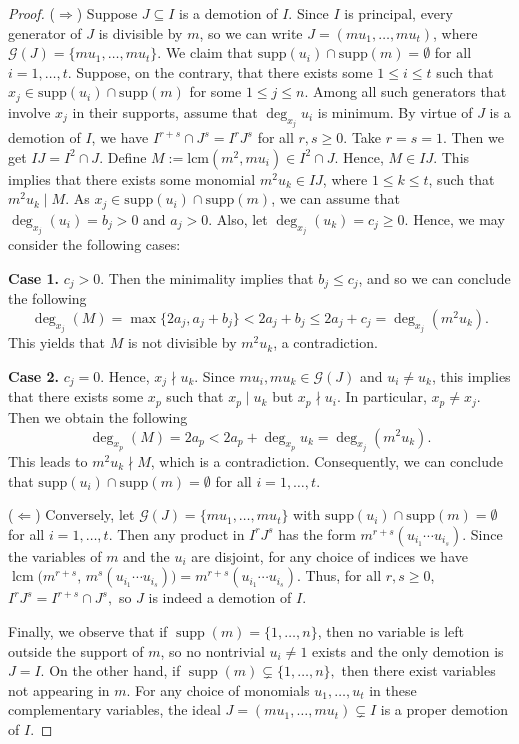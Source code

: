 \documentclass[11pt]{amsart}
\begin{document}
\begin{proof}
 ($\Rightarrow$)  Suppose $J \subseteq I$ is a demotion of $I$. Since $I$ is principal, every generator of $J$ is divisible by $m$, so we can write
 $J= (m u_1, \dots, m u_t)$, where $\mathcal{G}(J)=\{mu_1, \dots, m u_t\}$.  We claim that  $\mathrm{supp}(u_i)\cap \mathrm{supp}(m)=\emptyset$ 
for all $i=1, \ldots, t$.  Suppose, on the contrary, that  there exists some $1\leq i \leq t$ such that  $x_j\in \mathrm{supp}(u_i)\cap \mathrm{supp}(m)$
for some $1\leq j \leq n$. Among all such generators that involve $x_j$ in their supports, assume that $\deg_{x_j}u_i$ is minimum. 
By virtue of $J$ is a demotion of $I$, we have $I^{r+s}\cap J^s=I^rJ^s$ for all $r,s\geq 0$. 
Take $r = s = 1$. Then we get $I J = I^2 \cap J.$ Define $M:=\mathrm{lcm}(m^2, m u_i) \in I^2 \cap J.$ Hence, $M\in IJ$. 
This implies that there exists some monomial $m^2u_k\in IJ$, where $1\leq k\leq t$,  such that $m^2u_k\mid M$. As    $x_j\in \mathrm{supp}(u_i)\cap \mathrm{supp}(m)$, we can assume that   $\deg_{x_j}(u_i) = b_j > 0$ and   $a_j>0$.   Also, let  $\deg_{x_j}(u_k) = c_j \geq 0$.  Hence, we may consider the following cases:

\textbf{Case 1.} $c_j >0$. Then the minimality implies that $b_j\leq c_j$, and so we can conclude the  following 
$$\deg_{x_j}(M) = \max\{2a_j, a_j + b_j\} < 2a_j + b_j \leq 2a_j + c_j=\deg_{x_j}(m^2 u_k).$$
This yields that  $M$ is not divisible by $m^2 u_k$, a contradiction.

 \textbf{Case 2.} $c_j = 0$. Hence, $x_j\nmid u_k$. Since $mu_i,mu_k\in \mathcal{G}(J)$ and $u_i\neq u_k$, this implies that there exists some $x_p$ such that 
 $x_p\mid u_k$ but $x_p\nmid u_i$. In particular, $x_p\neq x_j$.  Then we obtain the following 
$$\deg_{x_p}(M) = 2a_p < 2a_p +\deg_{x_p}u_k=\deg_{x_j}(m^2 u_k).$$
This leads  to $m^2u_k\nmid M$, which is a contradiction. 
Consequently, we can conclude that $\mathrm{supp}(u_i)\cap \mathrm{supp}(m)=\emptyset$ for all $i=1, \ldots, t$. 

($\Leftarrow$)  Conversely, let   $\mathcal{G}(J)=\{mu_1, \dots, m u_t\}$ with  $\mathrm{supp}(u_i)\cap \mathrm{supp}(m)=\emptyset$
 for all $i=1, \ldots, t$.   Then any product in $I^r J^s$ has the form $m^{r+s}(u_{i_1} \cdots u_{i_s}).$ Since the variables of $m$ and the $u_i$ 
 are disjoint, for any choice of indices we have  $\operatorname{lcm}\bigl(m^{r+s},\, m^s(u_{i_1} \cdots u_{i_s})\bigr)= m^{r+s}(u_{i_1} \cdots u_{i_s}).$   
Thus, for all $r,s \geq 0$, $I^r J^s = I^{r+s} \cap J^s,$ so $J$ is indeed a demotion of $I$.

Finally, we observe  that if  $\operatorname{supp}(m) = \{1, \dots, n\}$, then no variable is left outside the support of $m$, so no nontrivial $u_i \neq 1$ exists and the only demotion is $J = I$. On the other hand, if $\operatorname{supp}(m) \subsetneq \{1, \dots, n\},$ then there exist variables not appearing in $m$. For any choice of monomials $u_1, \dots, u_t$ in these complementary variables, the ideal $J = (m u_1, \dots, m u_t) \subsetneq I$ is a proper demotion of $I$. 
\end{proof}
\end{document}
